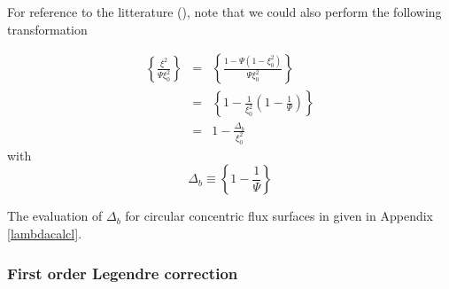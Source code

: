For reference to the litterature (\cite{kil86}), note that we could also
perform the following transformation

\begin{eqnarray}
\left\{ \frac{\xi ^{2}}{\Psi \xi _{0}^{2}}\right\} &=&\left\{ \frac{1-\Psi
\left( 1-\xi _{0}^{2}\right) }{\Psi \xi _{0}^{2}}\right\}  \nonumber \\
&=&\left\{ 1-\frac{1}{\xi _{0}^{2}}\left( 1-\frac{1}{\Psi }\right) \right\}
\nonumber \\
&=&1-\frac{\Delta _{b}}{\xi _{0}^{2}}
\end{eqnarray}
with
\begin{equation}
\Delta _{b}\equiv \left\{ 1-\frac{1}{\Psi }\right\}
\end{equation}

The evaluation of $\Delta _{b}$ for circular concentric flux surfaces in
given in Appendix \ref{lambdacalcl}.

\subsubsection{First order Legendre correction}

